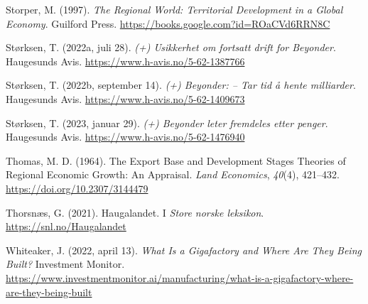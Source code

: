 \documentclass[
]{article}
\newlength{\cslhangindent}
\newlength{\cslentryspacingunit} %
\newenvironment{CSLReferences}[2] %
 {%
  \setlength{\parindent}{0pt}
  \ifodd #1
  \let\oldpar\par
  \def\par{\hangindent=\cslhangindent\oldpar}
  \fi
  \setlength{\parskip}{#2\cslentryspacingunit}
 }%
 {}
\begin{document}
\begin{CSLReferences}{1}{0}
\leavevmode{}%
Storper, M. (1997). \emph{The {Regional World}: {Territorial
Development} in a {Global Economy}}. {Guilford Press}.
\url{https://books.google.com?id=ROaCVd6RRN8C}

\leavevmode{}%
Størksen, T. (2022a, juli 28). \emph{(+) Usikkerhet om fortsatt drift
for Beyonder}. {Haugesunds Avis}.
\url{https://www.h-avis.no/5-62-1387766}

\leavevmode{}%
Størksen, T. (2022b, september 14). \emph{(+) Beyonder: -- Tar tid å
hente milliarder}. {Haugesunds Avis}.
\url{https://www.h-avis.no/5-62-1409673}

\leavevmode{}%
Størksen, T. (2023, januar 29). \emph{(+) Beyonder leter fremdeles etter
penger}. {Haugesunds Avis}. \url{https://www.h-avis.no/5-62-1476940}

\leavevmode{}%
Thomas, M. D. (1964). The {Export Base} and {Development Stages
Theories} of {Regional Economic Growth}: {An Appraisal}. \emph{Land
Economics}, \emph{40}(4), 421--432.
\url{https://doi.org/10.2307/3144479}

\leavevmode{}%
Thorsnæs, G. (2021). Haugalandet. I \emph{Store norske leksikon}.
\url{https://snl.no/Haugalandet}

\leavevmode{}%
Whiteaker, J. (2022, april 13). \emph{What Is a Gigafactory and Where
Are They Being Built?} {Investment Monitor}.
\url{https://www.investmentmonitor.ai/manufacturing/what-is-a-gigafactory-where-are-they-being-built}

\end{CSLReferences}
\end{document}
